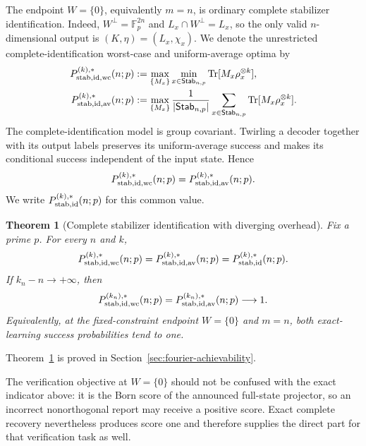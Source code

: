 \documentclass[11pt]{article}
\newcommand{\F}{\mathbb F}
\newcommand{\Tr}{\operatorname{Tr}}
\newcommand{\1}{\mathbf 1}
\theoremstyle{plain}
\newtheorem{theorem}{Theorem}[section]
\theoremstyle{definition}
\theoremstyle{remark}
\begin{document}
The endpoint $W=\{0\}$, equivalently $m=n$, is ordinary complete stabilizer
identification.  Indeed, $W^\perp=\F_p^{2n}$ and
$L_x\cap W^\perp=L_x$, so the only valid $n$-dimensional output is
$(K,\eta)=(L_x,\chi_x)$.  We denote the unrestricted complete-identification worst-case and
uniform-average optima by
\begin{align}
 P_{\rm stab,id,wc}^{(k),*}(n;p)
 &:=\max_{\{M_x\}}\min_{x\in\mathsf{Stab}_{n,p}}
 \Tr[M_x\rho_x^{\otimes k}],
 \label{eq:unrestricted-stabilizer-wc-success}\\
 P_{\rm stab,id,av}^{(k),*}(n;p)
 &:=\max_{\{M_x\}}\frac1{|\mathsf{Stab}_{n,p}|}
 \sum_{x\in\mathsf{Stab}_{n,p}}\Tr[M_x\rho_x^{\otimes k}].
 \label{eq:unrestricted-stabilizer-av-success}
\end{align}
The complete-identification model is group covariant.  Twirling a decoder
together with its output labels preserves its uniform-average success and
makes its conditional success independent of the input state.  Hence
\begin{equation}
 P_{\rm stab,id,wc}^{(k),*}(n;p)
 =P_{\rm stab,id,av}^{(k),*}(n;p).
 \label{eq:unrestricted-stabilizer-wc-av-equality}
\end{equation}
We write $P_{\rm stab,id}^{(k),*}(n;p)$ for this common value.

\begin{theorem}[Complete stabilizer identification with diverging overhead]
\label{thm:complete-identification-achievability}
Fix a prime $p$.  For every $n$ and $k$,
\begin{equation}
 P_{\rm stab,id,wc}^{(k),*}(n;p)
 =P_{\rm stab,id,av}^{(k),*}(n;p)
 =P_{\rm stab,id}^{(k),*}(n;p).
 \label{eq:complete-identification-wc-av-common-value}
\end{equation}
If $k_n-n\to+\infty$, then
\begin{equation}
 P_{\rm stab,id,wc}^{(k_n),*}(n;p)
 =P_{\rm stab,id,av}^{(k_n),*}(n;p)
 \longrightarrow1.
 \label{eq:complete-identification-wc-av-achievability}
\end{equation}
Equivalently, at the fixed-constraint endpoint $W=\{0\}$ and $m=n$, both
exact-learning success probabilities tend to one.
\end{theorem}
Theorem~\ref{thm:complete-identification-achievability} is proved in
Section~\ref{sec:fourier-achievability}.

The verification objective at $W=\{0\}$ should not be confused with the exact
indicator above: it is the Born score of the announced full-state projector,
so an incorrect nonorthogonal report may receive a positive score.  Exact
complete recovery nevertheless produces score one and therefore supplies the
direct part for that verification task as well.
\end{document}

